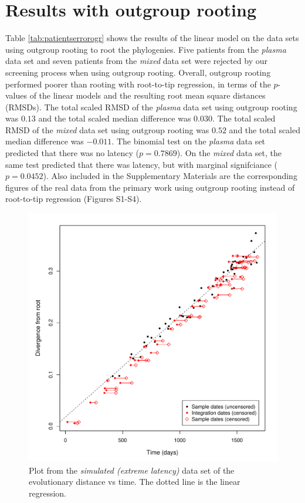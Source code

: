 \documentclass[12pt]{article}
\begin{document}
\section * {Results with outgroup rooting} \label{sec:ogr}
Table \ref{tab:patientserrorogr} shows the results of the linear model on the data sets using outgroup rooting \cite{Huelsenbeck02} to root the phylogenies.
Five patients from the \emph{plasma} data set and seven patients from the \emph{mixed} data set were rejected by our screening process when using outgroup rooting.
Overall, outgroup rooting performed poorer than rooting with root-to-tip regression, in terms of the $p$-values of the linear models and the resulting root mean square distances (RMSDs).
The total scaled RMSD of the \emph{plasma} data set using outgroup rooting was $0.13$ and the total scaled median difference was $0.030$.
The total scaled RMSD of the \emph{mixed} data set using outgroup rooting was $0.52$ and the total scaled median difference was $-0.011$.
The binomial test on the \emph{plasma} data set predicted that there was no latency ($p = 0.7869$).
On the \emph{mixed} data set, the same test predicted that there was latency, but with marginal signifciance ($p = 0.0452$).
Also included in the Supplementary Materials are the corresponding figures of the real data from the primary work using outgroup rooting instead of root-to-tip regression (Figures S1-S4).






\begin{figure}[ht]
	\centering
	\includegraphics[width=12cm]{figures/simulated_extreme.pdf}
	\caption[Simulated Data]{Plot from the \emph{simulated (extreme latency)} data set of the evolutionary distance vs time. The dotted line is the linear regression.}
	\label{fig:resultsextreme}
\end{figure}
\end{document}
